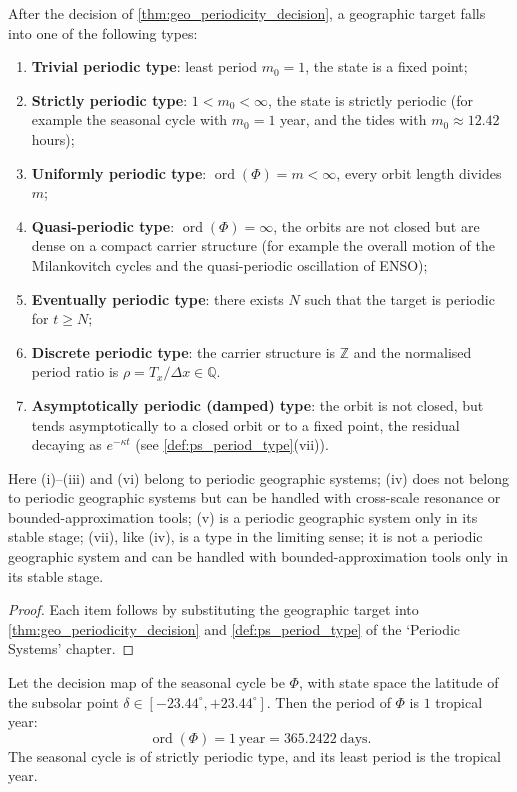 \begin{corollary}\label{cor:geo_period_type}
After the decision of \cref{thm:geo_periodicity_decision}, a geographic target falls into one of the following types:
\begin{enumerate}[label=(\roman*)]
    \item \textbf{Trivial periodic type}: least period $m_0=1$, the state is a fixed point;
    \item \textbf{Strictly periodic type}: $1<m_0<\infty$, the state is strictly periodic (for example the seasonal cycle with $m_0=1$ year, and the tides with $m_0\approx 12.42$ hours);
    \item \textbf{Uniformly periodic type}: $\operatorname{ord}(\Phi)=m<\infty$, every orbit length divides $m$;
    \item \textbf{Quasi-periodic type}: $\operatorname{ord}(\Phi)=\infty$, the orbits are not closed but are dense on a compact carrier structure (for example the overall motion of the Milankovitch cycles and the quasi-periodic oscillation of ENSO);
    \item \textbf{Eventually periodic type}: there exists $N$ such that the target is periodic for $t\ge N$;
    \item \textbf{Discrete periodic type}: the carrier structure is $\mathbb Z$ and the normalised period ratio is $\rho=T_x/\Delta x\in\mathbb Q$.
    \item \textbf{Asymptotically periodic (damped) type}: the orbit is not closed, but tends asymptotically to a closed orbit or to a fixed point, the residual decaying as $e^{-\kappa t}$ (see \cref{def:ps_period_type}(vii)).
\end{enumerate}
Here (i)--(iii) and (vi) belong to periodic geographic systems; (iv) does not belong to periodic geographic systems but can be handled with cross-scale resonance or bounded-approximation tools; (v) is a periodic geographic system only in its stable stage; (vii), like (iv), is a type in the limiting sense; it is not a periodic geographic system and can be handled with bounded-approximation tools only in its stable stage.
\end{corollary}

\begin{proof}
Each item follows by substituting the geographic target into \cref{thm:geo_periodicity_decision} and \cref{def:ps_period_type} of the `Periodic Systems' chapter.
\end{proof}

\begin{lemma}\label{lem:geo_seasonal_period}
Let the decision map of the seasonal cycle be $\Phi$, with state space the latitude of the subsolar point $\delta\in[-23.44^\circ,+23.44^\circ]$. Then the period of $\Phi$ is $1$ tropical year:
\[
\operatorname{ord}(\Phi)=1\ \text{year}=365.2422\ \text{days}.
\]
The seasonal cycle is of strictly periodic type, and its least period is the tropical year.
\end{lemma}

